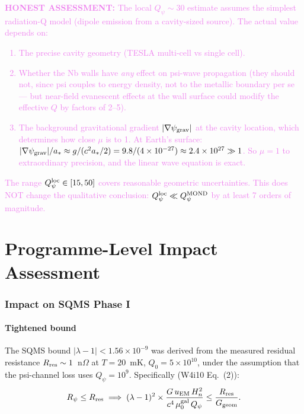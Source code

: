 \documentclass[11pt]{article}
\newcommand{\lam}{\lambda}
\newcommand{\ee}[1]{\times 10^{#1}}
\newcommand{\muG}{\mu_0^{\rm gal}}
\newcommand{\lbone}{|\lam - 1|}
\newcommand{\psigrav}{\psi_{\rm grav}}
\newcommand{\honest}[1]{\textcolor{violet}{\textbf{HONEST ASSESSMENT:} #1}}
\theoremstyle{definition}
\theoremstyle{remark}
\begin{document}
\honest{The local $Q_\psi \sim 30$ estimate assumes the simplest
radiation-Q model (dipole emission from a cavity-sized source). The
actual value depends on:
\begin{enumerate}[nosep]
\item The precise cavity geometry (TESLA multi-cell vs single cell).
\item Whether the Nb walls have \emph{any} effect on psi-wave
  propagation (they should not, since psi couples to energy density,
  not to the metallic boundary per se --- but near-field evanescent
  effects at the wall surface could modify the effective $Q$ by
  factors of 2--5).
\item The background gravitational gradient $|\nabla\psigrav|$ at the
  cavity location, which determines how close $\mu$ is to 1. At
  Earth's surface: $|\nabla\psigrav|/a_* \approx g/(c^2 a_*/2)
  = 9.8 / (4\ee{-27}) \approx 2.4\ee{27} \gg 1$. So $\mu = 1$
  to extraordinary precision, and the linear wave equation is exact.
\end{enumerate}

The range $Q_\psi^{\rm loc} \in [15, 50]$ covers reasonable
geometric uncertainties. This does NOT change the qualitative
conclusion: $Q_\psi^{\rm loc} \ll Q_\psi^{\rm MOND}$ by at least
7 orders of magnitude.}


\part{Programme-Level Impact Assessment}
\label{part:impact}


\section{Impact on SQMS Phase I}
\label{sec:sqms_impact}

\subsection{Tightened bound}

The SQMS bound $\lbone < 1.56\ee{-9}$ was derived from the measured
residual resistance $R_{\rm res} \sim 1$~n$\Omega$ at $T = 20$~mK,
$Q_0 = 5\ee{10}$, under the assumption that the psi-channel loss
uses $Q_\psi = 10^9$. Specifically (W4i10 Eq.~(2)):
\begin{equation}
R_\psi \leq R_{\rm res} \implies
(\lambda - 1)^2 \times \frac{G\,u_{\rm EM}\,H_n^2}{c^4\,\muG\,Q_\psi}
\leq \frac{R_{\rm res}}{G_{\rm geom}}.
\end{equation}
\end{document}
